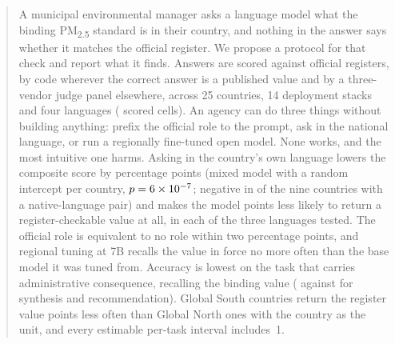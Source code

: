 \begin{abstract}

A municipal environmental manager asks a language model what the binding
PM\textsubscript{2.5} standard is in their country, and nothing in the answer
says whether it matches the official register. We propose a protocol for that
check and report what it finds. Answers are scored against official registers,
by code wherever the correct answer is a published value and by a three-vendor
judge panel elsewhere, across 25 countries, 14 deployment stacks and four
languages (\ncells{} scored cells). An agency can do three things without building
anything: prefix the official role to the prompt, ask in the national language,
or run a regionally fine-tuned open model. None works, and the most intuitive
one harms. Asking in the country's own language lowers the composite score by
\nhtwomixedcountryabs{} percentage points (mixed model with a random intercept
per country, $p=\nhtwomixedcountryp$; negative in \nhtwocneg{} of the nine
countries with a native-language pair) and makes the model \nverifdiffabs{}
points less likely to return a register-checkable value at all, in each of the
three languages tested. The official role is equivalent to no role within two
percentage points, and regional tuning at 7B recalls the value in force no more
often than the base model it was tuned from. Accuracy is lowest on the task
that carries administrative consequence, recalling the binding value
(\ntasktoneshort{} against \nfloorrestshort{} for synthesis and
recommendation). Global South countries return the register value
\ncodegapabs{} points less often than Global North ones with the country as the
unit, and every estimable per-task interval includes~1.

\end{abstract}
